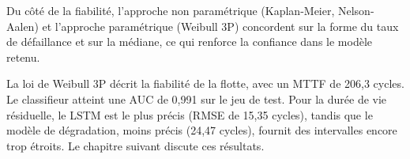 Du côté de la fiabilité, l'approche non paramétrique (Kaplan-Meier, Nelson-Aalen) et l'approche paramétrique (Weibull 3P) concordent sur la forme du taux de défaillance et sur la médiane, ce qui renforce la confiance dans le modèle retenu.

\chapconclusion

La loi de Weibull 3P décrit la fiabilité de la flotte, avec un MTTF de 206,3 cycles. Le classifieur atteint une AUC de 0,991 sur le jeu de test. Pour la durée de vie résiduelle, le LSTM est le plus précis (RMSE de 15,35 cycles), tandis que le modèle de dégradation, moins précis (24,47 cycles), fournit des intervalles encore trop étroits. Le chapitre suivant discute ces résultats.

